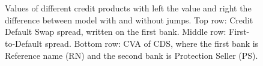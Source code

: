  \begin{figure}%
	\begin{center}
		\\
		\\
	\end{center}
	\vspace{-20pt}
	\caption{
	Values of different credit products with left the value and right the difference between model with and without jumps.
	Top row: Credit Default Swap spread, written on the first bank.
	Middle row: First-to-Default spread.
	Bottom row: CVA of CDS, where the first bank is Reference name (RN) and the second bank is Protection Seller (PS).
	}
 	\label{CDSPrice1}
	\label{FTDPrice1}
	\label{CVA1}
\end{figure}




%
%


